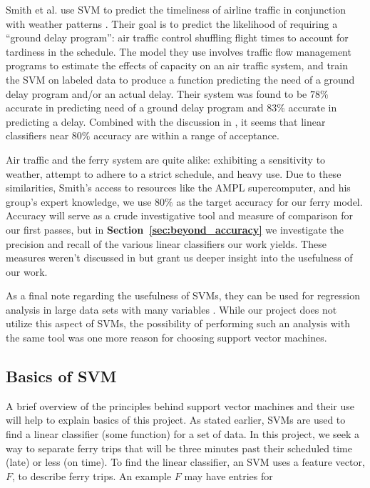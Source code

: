 \documentclass[11pt]{article} %
\begin{document}
Smith et al. use SVM to predict the timeliness of airline
traffic in conjunction with weather patterns \cite{smith2008decision}. Their goal 
is to predict the likelihood of requiring a ``ground delay program'': air traffic
control shuffling flight times
to account for tardiness in the schedule. The model they use involves traffic 
flow management programs to estimate the effects of capacity on an air traffic 
system, and train the SVM on labeled data to produce a function predicting 
the need of a ground delay program and/or an actual delay. Their system was
found to be $78\%$ accurate in predicting need of a ground delay program and $83\%$ 
accurate in predicting a delay. Combined with the discussion in 
\cite{byvatov2003comparison}, it seems that linear classifiers near $80\%$ 
accuracy are within a range of acceptance.

Air traffic and the ferry system are quite alike: exhibiting a
sensitivity to weather, attempt to adhere to a strict schedule, and heavy use.
Due to these similarities, Smith's access to resources like the AMPL supercomputer, 
and his group's expert knowledge, we use $80\%$ as the target accuracy for our
ferry model. Accuracy will serve as a crude investigative tool and measure of 
comparison for our first passes, but in \textbf{Section~\ref{sec:beyond_accuracy}}
we investigate the precision and recall of the various linear classifiers our
work yields. These measures weren't discussed in \cite{smith2008decision} but
grant us deeper insight into the usefulness of our work. 

As a final note regarding the usefulness of SVMs, they can be used for regression 
analysis in large
data sets with many variables \cite{chang2011libsvm}. While our project does not
utilize this aspect of SVMs, the possibility of performing such an analysis with the
same tool was one more reason for choosing support vector machines.


\subsection{Basics of SVM}
\label{sec:basics_svm}
A brief overview of the principles behind support vector machines and their use
will help to explain basics of this project. As stated earlier,
SVMs are used to find a linear classifier (some function) for a set of data.  In
this project, we seek a way to separate ferry trips that will be three minutes
past their scheduled time (late) or less (on time). To find the linear classifier,
an SVM uses a feature vector, $F$, to describe ferry trips.  An example $F$ may have
entries for
\end{document}
